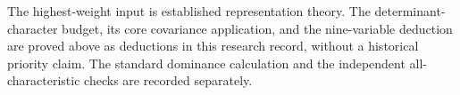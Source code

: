 The highest-weight input is established representation theory.
The determinant-character budget, its core covariance
application, and the nine-variable deduction are proved above
as deductions in this research record, without a historical
priority claim. The standard dominance calculation and the
independent all-characteristic checks are recorded separately.
